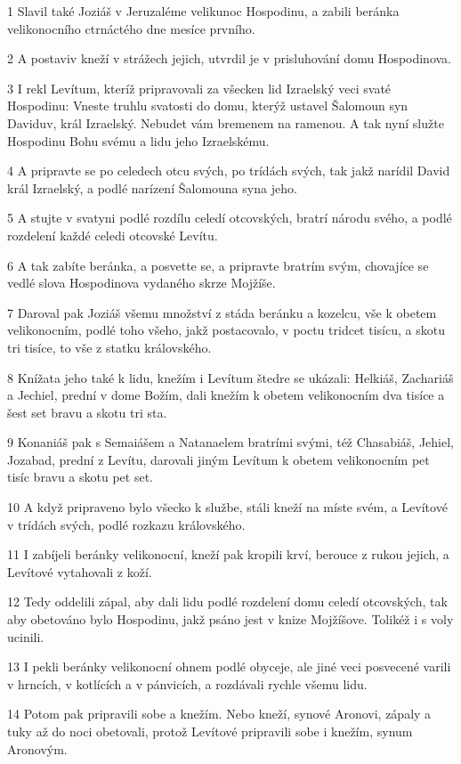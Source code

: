 \par 1 Slavil také Joziáš v Jeruzaléme velikunoc Hospodinu, a zabili beránka velikonocního ctrnáctého dne mesíce prvního.
\par 2 A postaviv kneží v strážech jejich, utvrdil je v prisluhování domu Hospodinova.
\par 3 I rekl Levítum, kteríž pripravovali za všecken lid Izraelský veci svaté Hospodinu: Vneste truhlu svatosti do domu, kterýž ustavel Šalomoun syn Daviduv, král Izraelský. Nebudet vám bremenem na ramenou. A tak nyní služte Hospodinu Bohu svému a lidu jeho Izraelskému.
\par 4 A pripravte se po celedech otcu svých, po trídách svých, tak jakž narídil David král Izraelský, a podlé narízení Šalomouna syna jeho.
\par 5 A stujte v svatyni podlé rozdílu celedí otcovských, bratrí národu svého, a podlé rozdelení každé celedi otcovské Levítu.
\par 6 A tak zabíte beránka, a posvette se, a pripravte bratrím svým, chovajíce se vedlé slova Hospodinova vydaného skrze Mojžíše.
\par 7 Daroval pak Joziáš všemu množství z stáda beránku a kozelcu, vše k obetem velikonocním, podlé toho všeho, jakž postacovalo, v poctu tridcet tisícu, a skotu tri tisíce, to vše z statku královského.
\par 8 Knížata jeho také k lidu, knežím i Levítum štedre se ukázali: Helkiáš, Zachariáš a Jechiel, prední v dome Božím, dali knežím k obetem velikonocním dva tisíce a šest set bravu a skotu tri sta.
\par 9 Konaniáš pak s Semaiášem a Natanaelem bratrími svými, též Chasabiáš, Jehiel, Jozabad, prední z Levítu, darovali jiným Levítum k obetem velikonocním pet tisíc bravu a skotu pet set.
\par 10 A když pripraveno bylo všecko k službe, stáli kneží na míste svém, a Levítové v trídách svých, podlé rozkazu královského.
\par 11 I zabíjeli beránky velikonocní, kneží pak kropili krví, berouce z rukou jejich, a Levítové vytahovali z koží.
\par 12 Tedy oddelili zápal, aby dali lidu podlé rozdelení domu celedí otcovských, tak aby obetováno bylo Hospodinu, jakž psáno jest v knize Mojžíšove. Tolikéž i s voly ucinili.
\par 13 I pekli beránky velikonocní ohnem podlé obyceje, ale jiné veci posvecené varili v hrncích, v kotlících a v pánvicích, a rozdávali rychle všemu lidu.
\par 14 Potom pak pripravili sobe a knežím. Nebo kneží, synové Aronovi, zápaly a tuky až do noci obetovali, protož Levítové pripravili sobe i knežím, synum Aronovým.
